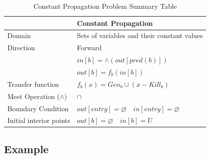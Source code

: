 \documentclass{article}
\begin{document}
\begin{table}[H]
	\centering
	\begin{tabular}{|p{}|p{}|}
		\hline
		                          & \textbf{Constant Propagation}                            \\
		\hline
		Domain                    & Sets of variables and their constant values              \\
		\hline
		Direction                 & Forward                                                  \\
		                          & $in[b] = \wedge(out[pred(b)])$                           \\
		                          & $out[b] = f_b(in[b])$                                    \\
		\hline
		Transfer function         & $f_b(x) = Gen_b \cup (x - Kill_b)$                       \\
		\hline
		Meet Operation ($\wedge$) & $\cap$                                                   \\
		\hline
		Boundary Condition        & $out[entry] = \varnothing \quad in[entry] = \varnothing$ \\
		\hline
		Initial interior points   & $out[b] = \varnothing \quad in[b] = U$                   \\
		\hline
	\end{tabular}
	\caption{Constant Propagation Problem Summary Table}
	\label{tab:dataflow_problem_x}
\end{table}

\subsection{Example}
\end{document}
